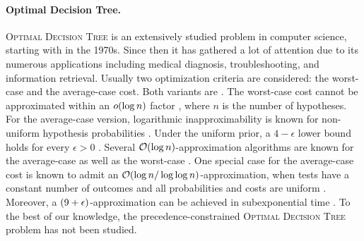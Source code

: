 \paragraph{Optimal Decision Tree.}
\textup{\textsc{Optimal Decision Tree}}
 is an extensively studied problem in computer science, starting with \cite{GareyPerfBoundsOnSplittingAlgForBinTesting} in the 1970s.
Since then it has gathered a lot of attention due to its numerous applications including medical diagnosis, troubleshooting, and information retrieval. 
Usually two optimization criteria are considered: the worst-case and the average-case cost.
Both variants are \NPhard \cite{ConstructOptimalBinaryDecisionTreesIsNPComplete,DTsforEntIdent}. The worst-case cost cannot be approximated within an $o\mathopen{}\left( \log n \right)$ factor \cite{HardnessOfMinHeightDTP}, where $n$ is the number of hypotheses. For the average-case version, logarithmic inapproximability is known for non-uniform hypothesis probabilities \cite{DTsforEntIdent}. Under the uniform prior, a $4-\epsilon$ lower bound holds for every $\epsilon>0$ \cite{DTsforEntIdent}.
Several $\mathcal{O}(\log n)$-approximation algorithms are known for the average-case \cite{ApproximatingOptimalBinaryDecisionTrees,DTsforEntIdent,ApproximatingDecisionTreesMultiwayBranches,DiagnosisDetermination,MinimumCostAdaptiveSubmodularCover,AnalysisGreedyActiveLearning,AdaptivityInAdaptiveSubmodularity,AverageCaseActiveLearningWithCosts,ApproxAlgsForOptDTsAndAdapTSPProblems,OptimalSplitTreeProblem,AdaptiveSubmodularRankingAndRouting} as well as the worst-case \cite{DecisionTreesForGeometricModels,TheCostComplexityOfInteractiveLearning,DiagnosisDetermination}. One special case for the average-case cost is known to admit an $\mathcal{O}\mathopen{}\left( \log n/\log \log n \right)$-approximation, when tests have a constant number of outcomes and all probabilities and costs are uniform \cite{TightAnalysisGreedyUniformDecisionTree}.
Moreover, a $\mathopen{}\left( 9+\epsilon \right)$-approximation can be achieved in subexponential time \cite{TightAnalysisGreedyUniformDecisionTree}.
To the best of our knowledge, the precedence-constrained \textup{\textsc{Optimal Decision Tree}} problem has not been studied.

